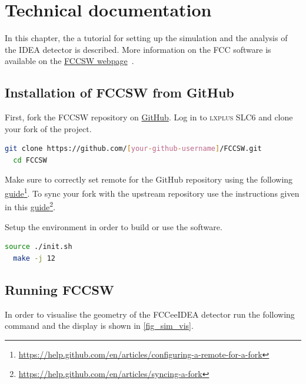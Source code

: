 \section{Technical documentation}

In this chapter, the a tutorial for setting up the simulation and the analysis of the IDEA detector is described. More information on the FCC software is available on the \href{http://fccsw.web.cern.ch/fccsw/}{FCCSW webpage}~\cite{FCCSW}.

\subsection{Installation of FCCSW from GitHub}

First, fork the FCCSW repository on \href{https://github.com/HEP-FCC/FCCSW}{GitHub}. Log in to \textsc{lxplus SLC6} and clone your fork of the project.

\begin{lstlisting}[language=bash,caption={Clone your fork of the FCCSW repository.}]
  git clone https://github.com/[your-github-username]/FCCSW.git
  cd FCCSW
\end{lstlisting}

Make sure to correctly set remote for the GitHub repository using the following \href{https://help.github.com/en/articles/configuring-a-remote-for-a-fork}{guide}\footnote{\href{https://help.github.com/en/articles/configuring-a-remote-for-a-fork}{https://help.github.com/en/articles/configuring-a-remote-for-a-fork}}. To sync your fork with the upstream repository use the instructions given in this \href{https://help.github.com/en/articles/syncing-a-fork}{guide}\footnote{\href{https://help.github.com/en/articles/syncing-a-fork}{https://help.github.com/en/articles/syncing-a-fork}}.

Setup the environment in order to build or use the software.
\begin{lstlisting}[language=bash,caption={Setup the environment and compile.}]
  source ./init.sh
  make -j 12
\end{lstlisting}

\subsection{Running FCCSW}

In order to visualise the geometry of the FCCeeIDEA detector run the following command and the display is shown in \cref{fig_sim_vis}.

